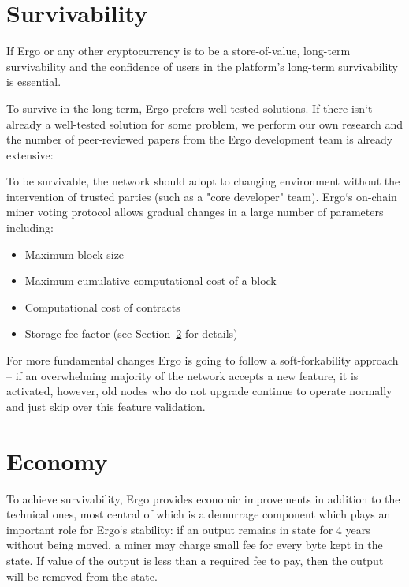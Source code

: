 \documentclass[]{article}
\begin{document}
    \section{Survivability}

    If Ergo or any other cryptocurrency is to be a store-of-value, long-term survivability and the
    confidence of users in the platform’s long-term survivability is essential.

    To survive in the long-term, Ergo prefers well-tested solutions. If there isn`t already a well-tested
    solution for some problem, we perform our own research and the number of peer-reviewed
    papers from the Ergo development team is already extensive:~\cite{reyzin2017improving,meshkov2017short,chepurnoy2018systematic,chepurnoy2018self,chepurnoy2018checking,duong2018multi}

    To be survivable, the network should adopt to changing environment without the intervention
    of trusted parties (such as a "core developer" team). Ergo`s on-chain miner voting protocol
    allows gradual changes in a large number of parameters including:

    \begin{itemize}
        \item Maximum block size
        \item Maximum cumulative computational cost of a block
        \item Computational cost of contracts
        \item Storage fee factor (see Section~\ref{sec:economy} for details)
    \end{itemize}

    For more fundamental changes Ergo is going to follow a soft-forkability approach -- if an
    overwhelming majority of the network accepts a new feature, it is activated, however, old nodes
    who do not upgrade continue to operate normally and just skip over this feature validation.

    \section{Economy}
    \label{sec:economy}

    To achieve survivability, Ergo provides economic improvements in addition to the technical
    ones, most central of which is a demurrage component which plays an important role for Ergo`s
    stability: if an output remains in state for 4 years without being moved, a miner may charge
    small fee for every byte kept in the state. If value of the output is less than a required fee to
    pay, then the output will be removed from the state.
\end{document}
